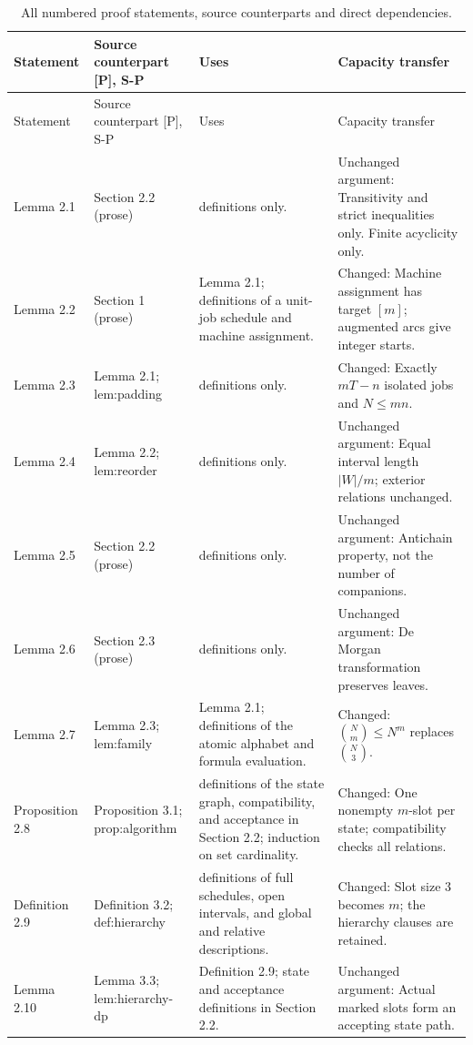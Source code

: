 \documentclass[11pt,a4paper]{article}
\theoremstyle{plain}
\theoremstyle{definition}
\begin{document}
{\footnotesize
\begin{longtable}{@{}L{2.6cm}L{3.2cm}L{3.7cm}L{5.1cm}@{}}
\caption{All numbered proof statements, source counterparts and direct dependencies.}\label{tab:dep}\\
\toprule Statement & Source counterpart [P], S-P & Uses & Capacity transfer\\\midrule\endfirsthead
\toprule Statement & Source counterpart [P], S-P & Uses & Capacity transfer\\\midrule\endhead
\bottomrule\endfoot
Lemma 2.1 & Section 2.2 (prose) & definitions only. & Unchanged argument: Transitivity and strict inequalities only. Finite acyclicity only.\\[3pt]
Lemma 2.2 & Section 1 (prose) & Lemma 2.1; definitions of a unit-job schedule and machine assignment. & Changed: Machine assignment has target \([m]\); augmented arcs give integer starts.\\[3pt]
Lemma 2.3 & Lemma 2.1; \textsf{lem:\allowbreak padding} & definitions only. & Changed: Exactly \(mT-n\) isolated jobs and \(N\leq mn\).\\[3pt]
Lemma 2.4 & Lemma 2.2; \textsf{lem:\allowbreak reorder} & definitions only. & Unchanged argument: Equal interval length \(|W|/m\); exterior relations unchanged.\\[3pt]
Lemma 2.5 & Section 2.2 (prose) & definitions only. & Unchanged argument: Antichain property, not the number of companions.\\[3pt]
Lemma 2.6 & Section 2.3 (prose) & definitions only. & Unchanged argument: De Morgan transformation preserves leaves.\\[3pt]
Lemma 2.7 & Lemma 2.3; \textsf{lem:\allowbreak family} & Lemma 2.1; definitions of the atomic alphabet and formula evaluation. & Changed: \(\binom Nm\leq N^m\) replaces \(\binom N3\).\\[3pt]
Proposition 2.8 & Proposition 3.1; \textsf{prop:\allowbreak algorithm} & definitions of the state graph, compatibility, and acceptance in Section 2.2; induction on set cardinality. & Changed: One nonempty \(m\)-slot per state; compatibility checks all relations.\\[3pt]
Definition 2.9 & Definition 3.2; \textsf{def:\allowbreak hierarchy} & definitions of full schedules, open intervals, and global and relative descriptions. & Changed: Slot size $3$ becomes $m$; the hierarchy clauses are retained.\\[3pt]
Lemma 2.10 & Lemma 3.3; \textsf{lem:\allowbreak hierarchy-\allowbreak dp} & Definition 2.9; state and acceptance definitions in Section 2.2. & Unchanged argument: Actual marked slots form an accepting state path.\\[3pt]

\end{longtable}}
\end{document}
